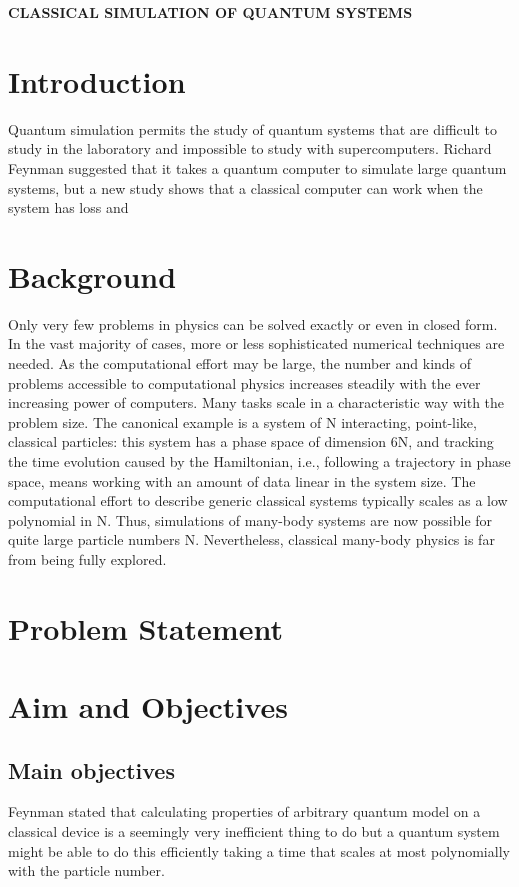 \documentclass[options]{article}
\begin{document}
\textbf{CLASSICAL SIMULATION OF QUANTUM SYSTEMS}

\section{\textbf{ Introduction}}
Quantum simulation permits the study of quantum systems that are difficult to study in the laboratory and impossible to study with supercomputers.
Richard Feynman suggested that it takes a quantum computer to simulate large quantum systems, but a new study shows that a classical computer can work when the system has loss and 


\section{\textbf{ Background }}
Only very few problems in physics can be solved exactly or even in closed form. In the vast majority of cases, more or less sophisticated numerical techniques are needed. As the computational effort may be large, the number and kinds of problems accessible to computational physics increases steadily with the ever increasing power of computers. Many tasks scale in a characteristic way with the problem size. The canonical example is a system of N interacting, point-like, classical particles: this system has a phase space of dimension 6N, and tracking the time evolution caused by the Hamiltonian, i.e., following a trajectory in phase space, means working with an amount of data linear in the system size. The computational effort to describe generic classical systems typically scales as a low polynomial in N. Thus, simulations of many-body systems are now possible for quite large particle numbers N. Nevertheless, classical many-body physics is far from being fully explored.

\section{\textbf{ Problem Statement}}

\section{\textbf{ Aim and Objectives}}

\subsection{Main objectives}
Feynman stated that calculating properties of arbitrary quantum model on a classical device is a seemingly very inefficient thing to do but a quantum system might be able to do this efficiently taking a time that scales at most polynomially with the particle number.
\end{document}
